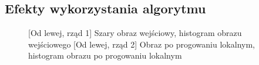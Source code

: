 \documentclass[a4paper,12pt, titlepage]{report}
\begin{document}
\subsection*{Efekty wykorzystania algorytmu}
\begin{figure}[h]
    \centering
    \qquad
    \caption{[Od lewej, rząd 1] Szary obraz wejściowy, histogram obrazu wejściowego [Od lewej, rząd 2] Obraz po progowaniu lokalnym, histogram obrazu po progowaniu lokalnym}%
    \label{fig:rysunek}%
\end{figure}
\end{document}
